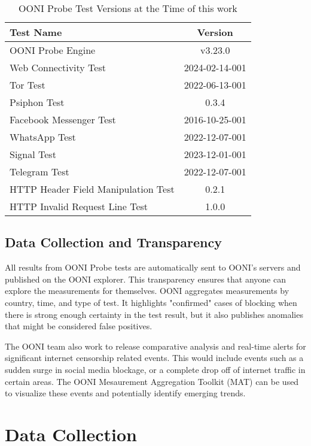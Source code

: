 \begin{table}[H]
\centering
\caption{OONI Probe Test Versions at the Time of this work}
\begin{tabular}{lc}
\toprule
\textbf{Test Name} & \textbf{Version} \\
\midrule
OONI Probe Engine & v3.23.0 \\
Web Connectivity Test    & 2024-02-14-001  \\
Tor Test    & 2022-06-13-001  \\
Psiphon Test    & 0.3.4  \\
Facebook Messenger Test    & 2016-10-25-001  \\
WhatsApp Test    & 2022-12-07-001  \\
Signal Test    & 2023-12-01-001  \\
Telegram Test    & 2022-12-07-001  \\
HTTP Header Field Manipulation Test    & 0.2.1  \\
HTTP Invalid Request Line Test    & 1.0.0  \\
\bottomrule
\end{tabular}
\label{tab:blocked_summary}
\end{table}

\subsection{Data Collection and Transparency}

All results from OONI Probe tests are automatically sent to OONI's servers and published on the OONI explorer. This transparency ensures that anyone can explore the measurements for themselves. OONI aggregates measurements by country, time, and type of test. It highlights "confirmed" cases of blocking when there is strong enough certainty in the test result, but it also publishes anomalies that might be considered false positives. 

The OONI team also work to release comparative analysis and real-time alerts for significant internet censorship related events. This would include events such as a sudden surge in social media blockage, or a complete drop off of internet traffic in certain areas. The OONI Mesaurement Aggregation Toolkit (MAT) can be used to visualize these events and potentially identify emerging trends. 

\section{Data Collection}

